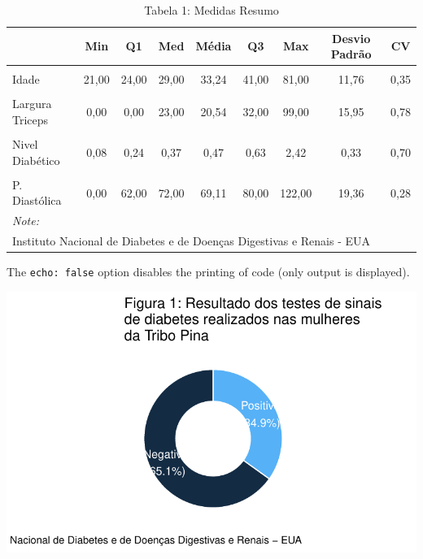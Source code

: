 \documentclass[
  letterpaper,
  DIV=11,
  numbers=noendperiod]{scrartcl}
\begin{document}
\begin{table}

\caption{Tabela 1: Medidas Resumo}
\centering
\begin{tabular}[t]{l|c|c|c|c|c|c|c|c}
\hline
  & Min & Q1 & Med & Média & Q3 & Max & Desvio Padrão & CV\\
\hline
\cellcolor{TRUE}{Glicose} & \cellcolor{TRUE}{0,00} & \cellcolor{TRUE}{99,00} & \cellcolor{TRUE}{117,00} & \cellcolor{TRUE}{120,89} & \cellcolor{TRUE}{140,50} & \cellcolor{TRUE}{199,00} & \cellcolor{TRUE}{31,97} & \cellcolor{TRUE}{0,26}\\
\hline
Idade & 21,00 & 24,00 & 29,00 & 33,24 & 41,00 & 81,00 & 11,76 & 0,35\\
\hline
\cellcolor{TRUE}{IMC} & \cellcolor{TRUE}{0,00} & \cellcolor{TRUE}{27,30} & \cellcolor{TRUE}{32,00} & \cellcolor{TRUE}{31,99} & \cellcolor{TRUE}{36,60} & \cellcolor{TRUE}{67,10} & \cellcolor{TRUE}{7,88} & \cellcolor{TRUE}{0,25}\\
\hline
Largura Triceps & 0,00 & 0,00 & 23,00 & 20,54 & 32,00 & 99,00 & 15,95 & 0,78\\
\hline
\cellcolor{TRUE}{N° de Gestações} & \cellcolor{TRUE}{0,00} & \cellcolor{TRUE}{1,00} & \cellcolor{TRUE}{3,00} & \cellcolor{TRUE}{3,85} & \cellcolor{TRUE}{6,00} & \cellcolor{TRUE}{17,00} & \cellcolor{TRUE}{3,37} & \cellcolor{TRUE}{0,88}\\
\hline
Nivel Diabético & 0,08 & 0,24 & 0,37 & 0,47 & 0,63 & 2,42 & 0,33 & 0,70\\
\hline
\cellcolor{TRUE}{Nível Insulina} & \cellcolor{TRUE}{0,00} & \cellcolor{TRUE}{0,00} & \cellcolor{TRUE}{30,50} & \cellcolor{TRUE}{79,80} & \cellcolor{TRUE}{127,50} & \cellcolor{TRUE}{846,00} & \cellcolor{TRUE}{115,24} & \cellcolor{TRUE}{1,44}\\
\hline
P. Diastólica & 0,00 & 62,00 & 72,00 & 69,11 & 80,00 & 122,00 & 19,36 & 0,28\\
\hline
\multicolumn{9}{l}{\rule{0pt}{1em}\textit{Note: }}\\
\multicolumn{9}{l}{\rule{0pt}{1em}Instituto Nacional de Diabetes e de Doenças Digestivas e Renais - EUA}\\
\end{tabular}
\end{table}

The \texttt{echo:\ false} option disables the printing of code (only
output is displayed).

\includegraphics{relatorio_lab1_files/figure-pdf/unnamed-chunk-3-1.pdf}
\end{document}
